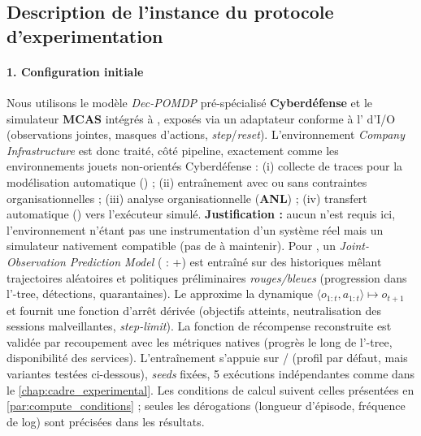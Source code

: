 \subsection{Description de l'instance du protocole d'experimentation}

\paragraph{1. Configuration initiale}

Nous utilisons le modèle \emph{Dec-POMDP} pré-spécialisé \textbf{Cyberdéfense} et le simulateur \textbf{MCAS} intégrés à , exposés via un adaptateur  conforme à l' d'I/O  (observations jointes, masques d'actions, \emph{step}/\emph{reset}). L'environnement \emph{Company Infrastructure} est donc traité, côté pipeline, exactement comme les environnements jouets non-orientés Cyberdéfense : (i) collecte de traces pour la modélisation automatique () ; (ii) entraînement  avec ou sans contraintes organisationnelles ; (iii) analyse organisationnelle (\textbf{ANL}) ; (iv) transfert automatique () vers l'exécuteur simulé.
\textbf{Justification :} aucun  n'est requis ici, l'environnement n'étant pas une instrumentation d'un système réel mais un simulateur nativement compatible (pas de  à maintenir).
Pour , un \emph{Joint-Observation Prediction Model} ( : +) est entraîné sur des historiques mêlant trajectoires aléatoires et politiques préliminaires \emph{rouges/bleues} (progression dans l'-tree, détections, quarantaines). Le  approxime la dynamique $\langle o_{1:t},a_{1:t} \rangle \mapsto o_{t+1}$ et fournit une fonction d'arrêt dérivée (objectifs atteints, neutralisation des sessions malveillantes, \emph{step-limit}). La fonction de récompense reconstruite est validée par recoupement avec les métriques natives (progrès le long de l'-tree, disponibilité des services). L'entraînement s'appuie sur / (profil  par défaut, mais variantes testées ci-dessous), \emph{seeds} fixées, 5 exécutions indépendantes comme dans le \autoref{chap:cadre_experimental}. Les conditions de calcul suivent celles présentées en \autoref{par:compute_conditions} ; seules les dérogations (longueur d'épisode, fréquence de log) sont précisées dans les résultats.

